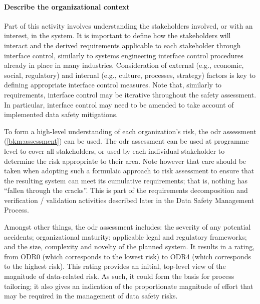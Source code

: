 \paragraph{Describe the organizational context}
Part of this activity involves understanding the \glspl{stakeholder} involved, or with an interest, in the system. It is important to define how the \glspl{stakeholder} will interact and the derived requirements applicable to each \gls{stakeholder} through interface control, similarly to systems engineering interface control procedures already in place in many industries. Consideration of external (e.g., economic, social, regulatory) and internal (e.g., culture, processes, strategy) factors is key to defining appropriate interface control measures. Note that, similarly to requirements, interface control may be iterative throughout the \gls{safety assessment}. In particular, interface control may need to be amended to take account of implemented data safety mitigations.

To form
a high-level understanding of each organization's risk,
the \gls{odr} assessment (\autoref{bkm:assessment}) can be used. The \gls{odr} assessment can be used at programme level to cover all \glspl{stakeholder}, or used by each individual \gls{stakeholder} to determine the
risk
appropriate to their area.
Note however that care should be taken when adopting such a formulaic approach to risk assessment
to ensure that the resulting system can meet its cumulative requirements; that is, nothing has ``fallen through the cracks''. This is part of the requirements decomposition and \gls{verification} / \gls{validation} activities described later in the Data Safety Management Process.

Amongst other things, the \gls{odr} assessment includes: the severity of any potential accidents; organizational maturity; applicable legal and regulatory frameworks; and the size, complexity and novelty of the planned system. It results in a rating, from ODR0 (which corresponds to the lowest risk) to ODR4 (which corresponds to the highest risk). This rating provides an initial, top-level view of the magnitude of data-related risk. As such, it
could form
the basis for process tailoring; it also
gives an indication of the proportionate magnitude of effort that may be required in the management of data safety risks.

